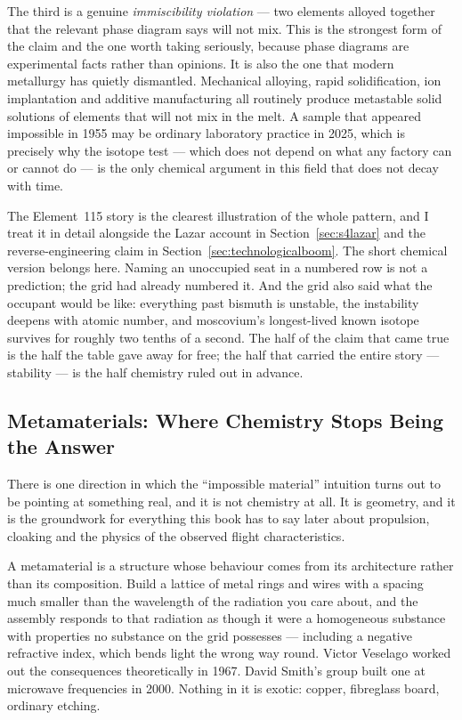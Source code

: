 The third is a genuine \emph{immiscibility violation} --- two elements alloyed together that the
relevant phase diagram says will not mix. This is the strongest form of the claim and the one
worth taking seriously, because phase diagrams are experimental facts rather than opinions. It is
also the one that modern metallurgy has quietly dismantled. Mechanical alloying, rapid
solidification, ion implantation and additive manufacturing all routinely produce metastable
solid solutions of elements that will not mix in the melt.  A sample that
appeared impossible in 1955 may be ordinary laboratory practice in 2025, which is precisely why
the isotope test --- which does not depend on what any factory can or cannot do --- is the only
chemical argument in this field that does not decay with time.

The Element~115 story is the clearest illustration of the whole pattern, and I treat it in detail
alongside the Lazar account in Section~\ref{sec:s4lazar} and the reverse-engineering claim in
Section~\ref{sec:technologicalboom}. The short chemical version belongs here. Naming an
unoccupied seat in a numbered row is not a prediction; the grid had already numbered it. And the
grid also said what the occupant would be like: everything past bismuth is unstable, the
instability deepens with atomic number, and moscovium's longest-lived known isotope survives for
roughly two tenths of a second.  The half of the claim that came true is the half the table gave away for
free; the half that carried the entire story --- stability --- is the half chemistry ruled out in
advance.

\subsection{Metamaterials: Where Chemistry Stops Being the Answer}

There is one direction in which the ``impossible material'' intuition turns out to be pointing at
something real, and it is not chemistry at all. It is geometry, and it is the groundwork for
everything this book has to say later about propulsion, cloaking and the physics of the observed
flight characteristics.

A metamaterial is a structure whose behaviour comes from its architecture rather than its
composition. Build a lattice of metal rings and wires with a spacing much smaller than the
wavelength of the radiation you care about, and the assembly responds to that radiation as though
it were a homogeneous substance with properties no substance on the grid possesses --- including a
negative refractive index, which bends light the wrong way round. Victor Veselago worked out the
consequences theoretically in 1967. David Smith's group built one at microwave frequencies in
2000. Nothing in it is exotic: copper, fibreglass board, ordinary etching.

